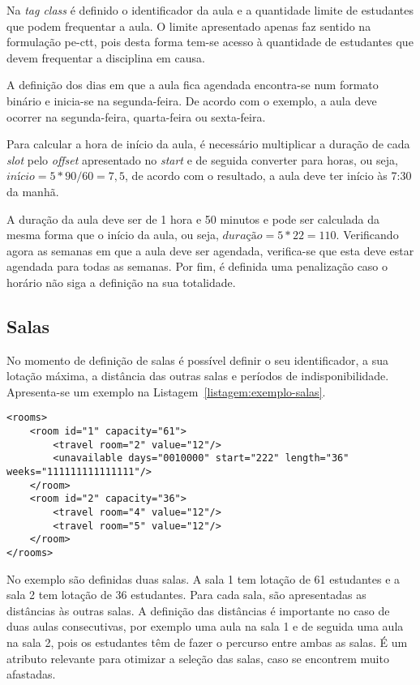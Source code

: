 Na \textit{tag class} é definido o identificador da aula e a quantidade limite de estudantes que podem frequentar a aula. O limite apresentado apenas faz sentido na formulação \gls{pe-ctt}, pois desta forma tem-se acesso à quantidade de estudantes que devem frequentar a disciplina em causa.

A definição dos dias em que a aula fica agendada encontra-se num formato binário e inicia-se na segunda-feira. De acordo com o exemplo, a aula deve ocorrer na segunda-feira, quarta-feira ou sexta-feira.

Para calcular a hora de início da aula, é necessário multiplicar a duração de cada \textit{slot} pelo \textit{offset} apresentado no \textit{start} e de seguida converter para horas, ou seja, $início = 5*90/60 = 7,5$, de acordo com o resultado, a aula deve ter início às 7:30 da manhã.

A duração da aula deve ser de 1 hora e 50 minutos e pode ser calculada da mesma forma que o início da aula, ou seja, $duração = 5*22 = 110$. Verificando agora as semanas em que a aula deve ser agendada, verifica-se que esta deve estar agendada para todas as semanas. Por fim, é definida uma penalização caso o horário não siga a definição na sua totalidade.

\subsection{Salas}

No momento de definição de salas é possível definir o seu identificador, a sua lotação máxima, a distância das outras salas e períodos de indisponibilidade. Apresenta-se um exemplo na Listagem~\ref{listagem:exemplo-salas}.

\begin{minipage}[c]{\linewidth}
\begin{lstlisting}[caption={Exemplo da definição das salas.}, label={listagem:exemplo-salas}]
<rooms>
    <room id="1" capacity="61">
        <travel room="2" value="12"/>
        <unavailable days="0010000" start="222" length="36" weeks="111111111111111"/>
    </room>
    <room id="2" capacity="36">
        <travel room="4" value="12"/>
        <travel room="5" value="12"/>
    </room>
</rooms>
\end{lstlisting}
\end{minipage}

No exemplo são definidas duas salas. A sala 1 tem lotação de 61 estudantes e a sala 2 tem lotação de 36 estudantes. Para cada sala, são apresentadas as distâncias às outras salas. A definição das distâncias é importante no caso de duas aulas consecutivas, por exemplo uma aula na sala 1 e de seguida uma aula na sala 2, pois os estudantes têm de fazer o percurso entre ambas as salas. É um atributo relevante para otimizar a seleção das salas, caso se encontrem muito afastadas.


